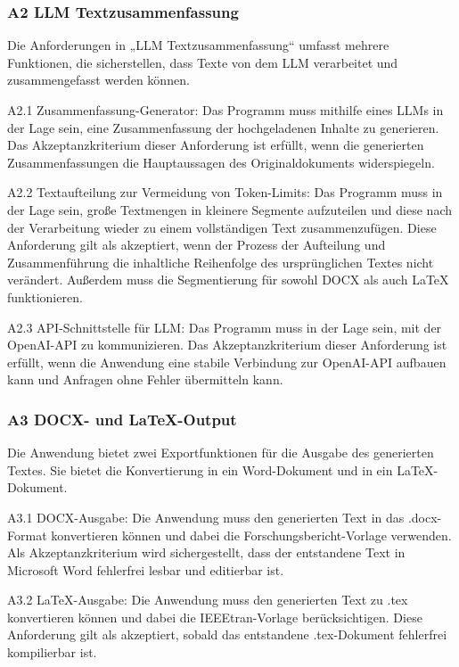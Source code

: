 \subsubsection{A2 \ac{LLM} Textzusammenfassung}
Die Anforderungen in „\ac{LLM} Textzusammenfassung“ umfasst mehrere Funktionen, die sicherstellen, dass Texte von dem \ac{LLM} verarbeitet und zusammengefasst werden können.

A2.1 Zusammenfassung-Generator: Das Programm muss mithilfe eines \ac{LLM}s in der Lage sein, eine Zusammenfassung der hochgeladenen Inhalte zu generieren. Das Akzeptanzkriterium dieser Anforderung ist erfüllt, wenn die generierten Zusammenfassungen die Hauptaussagen des Originaldokuments widerspiegeln.

A2.2 Textaufteilung zur Vermeidung von Token-Limits: Das Programm muss in der Lage sein, große Textmengen in kleinere Segmente aufzuteilen und diese nach der Verarbeitung wieder zu einem vollständigen Text zusammenzufügen. Diese Anforderung gilt als akzeptiert, wenn der Prozess der Aufteilung und Zusammenführung die inhaltliche Reihenfolge des ursprünglichen Textes nicht verändert. Außerdem muss die Segmentierung für sowohl \ac{DOCX} als auch LaTeX funktionieren.

A2.3 \ac{API}-Schnittstelle für \ac{LLM}: Das Programm muss in der Lage sein, mit der OpenAI-\ac{API} zu kommunizieren. Das Akzeptanzkriterium dieser Anforderung ist erfüllt, wenn die Anwendung eine stabile Verbindung zur OpenAI-\ac{API} aufbauen kann und Anfragen ohne Fehler übermitteln kann.

\subsubsection{A3 \ac{DOCX}- und LaTeX-Output}
Die Anwendung bietet zwei Exportfunktionen für die Ausgabe des generierten Textes. Sie bietet die Konvertierung in ein Word-Dokument und in ein LaTeX-Dokument.

A3.1 \ac{DOCX}-Ausgabe: Die Anwendung muss den generierten Text in das .docx-Format konvertieren können und dabei die Forschungsbericht-Vorlage verwenden. Als Akzeptanzkriterium wird sichergestellt, dass der entstandene Text in Microsoft Word fehlerfrei lesbar und editierbar ist. 

A3.2 LaTeX-Ausgabe: Die Anwendung muss den generierten Text zu .tex konvertieren können und dabei die IEEEtran-Vorlage berücksichtigen. Diese Anforderung gilt als akzeptiert, sobald das entstandene .tex-Dokument fehlerfrei kompilierbar ist.

